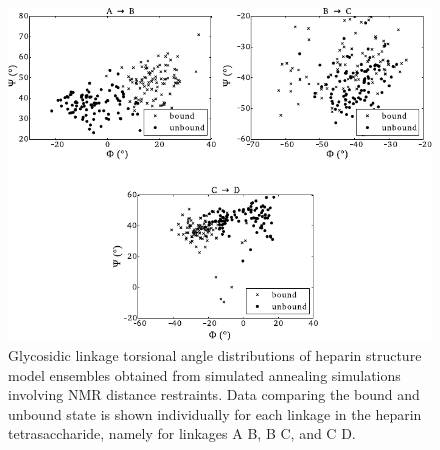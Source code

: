 \begin{figure}
\begin{adjustwidth}{-1cm}{-1cm}
\centering
\includegraphics[width=1.1\textwidth]{gfx/nmr/glycolinkage_dihedrals_bound_vs_free_3panels_03.pdf}
\caption[]{
Glycosidic linkage torsional angle distributions of heparin structure model
ensembles obtained from simulated annealing simulations involving NMR distance
restraints. Data comparing the bound and unbound state is shown individually for
each linkage in the heparin tetrasaccharide, namely for linkages A
\rightarrow B, B \rightarrow C, and C \rightarrow D.
}
\label{fig:nmr:hp_glyco_dihedral_distributions}
\end{adjustwidth}
\end{figure}

